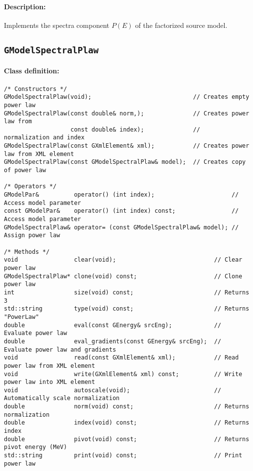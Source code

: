 \documentclass{article}[12pt,a4]
\begin{document}
\paragraph{Description:}
Implements the spectra component $P(E)$ of the factorized source model.


\newpage
\subsection{{\tt GModelSpectralPlaw}}

\paragraph{Class definition:}
\begin{verbatim}
/* Constructors */
GModelSpectralPlaw(void);                             // Creates empty power law
GModelSpectralPlaw(const double& norm,);              // Creates power law from
                   const double& index);              //   normalization and index
GModelSpectralPlaw(const GXmlElement& xml);           // Creates power law from XML element
GModelSpectralPlaw(const GModelSpectralPlaw& model);  // Creates copy of power law

/* Operators */
GModelPar&          operator() (int index);                      // Access model parameter
const GModelPar&    operator() (int index) const;                // Access model parameter
GModelSpectralPlaw& operator= (const GModelSpectralPlaw& model); // Assign power law

/* Methods */
void                clear(void);                            // Clear power law
GModelSpectralPlaw* clone(void) const;                      // Clone power law
int                 size(void) const;                       // Returns 3
std::string         type(void) const;                       // Returns "PowerLaw"
double              eval(const GEnergy& srcEng);            // Evaluate power law
double              eval_gradients(const GEnergy& srcEng);  // Evaluate power law and gradients
void                read(const GXmlElement& xml);           // Read power law from XML element
void                write(GXmlElement& xml) const;          // Write power law into XML element
void                autoscale(void);                        // Automatically scale normalization
double              norm(void) const;                       // Returns normalization
double              index(void) const;                      // Returns index
double              pivot(void) const;                      // Returns pivot energy (MeV)
std::string         print(void) const;                      // Print power law
\end{verbatim}
\end{document}
